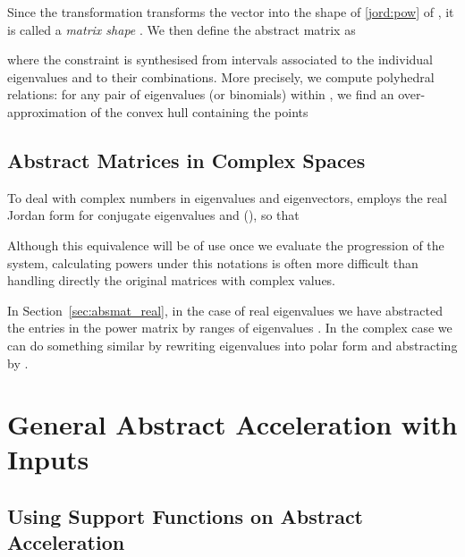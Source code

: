 \documentclass{IEEEtran}
\begin{document}
Since the transformation  transforms the vector  into the shape of \eqref{jord:pow} of , it is called a \emph{matrix shape} \cite{JSS14}. 
We then define the abstract matrix as
 
where the constraint  is synthesised
from intervals associated to the individual eigenvalues and to their
combinations.  More precisely, we compute polyhedral relations: 
for any pair of eigenvalues (or binomials) within , we find
an over-approximation of the convex hull containing the points 



\subsection{Abstract Matrices in Complex Spaces}\label{sec:absmat_complex}


To deal with complex numbers in eigenvalues and eigenvectors, 
\cite{JSS14} employs the real Jordan form for conjugate eigenvalues 
 and  (), so that 

Although this equivalence will be of use once we evaluate the progression of the system, 
calculating powers under this notations is often more difficult than handling directly the original matrices with complex values.  

In Section~\ref{sec:absmat_real}, 
in the case of real eigenvalues we have abstracted the entries in the power matrix  by ranges of eigenvalues
.  
In the complex case we can do something similar by rewriting
eigenvalues into polar form  and abstracting
by .

\section{General Abstract Acceleration with Inputs} \label{sec:forward_aa}


\subsection{Using Support Functions on Abstract Acceleration}\label{sec:support_aa}
\end{document}
